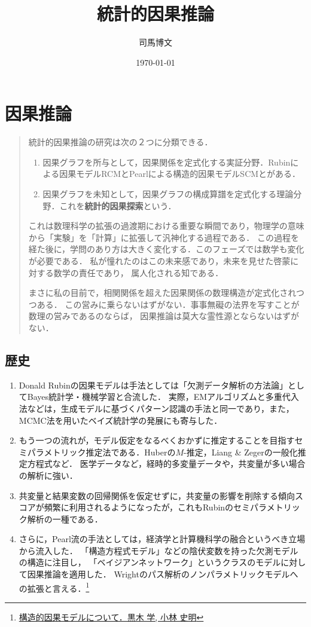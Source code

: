 \documentclass[uplatex,dvipdfmx]{jsreport}
\title{統計的因果推論}
\author{司馬博文}
\date{\today}
\begin{document}
\tableofcontents

\chapter{因果推論}

\begin{quotation}
    統計的因果推論の研究は次の２つに分類できる．
    \begin{enumerate}
        \item 因果グラフを所与として，因果関係を定式化する実証分野．Rubinによる因果モデルRCMとPearlによる構造的因果モデルSCMとがある．
        \item 因果グラフを未知として，因果グラフの構成算譜を定式化する理論分野．これを\textbf{統計的因果探索}という．
    \end{enumerate}
    これは数理科学の拡張の過渡期における重要な瞬間であり，物理学の意味から「実験」を「計算」に拡張して汎神化する過程である．
    この過程を経た後に，学問のあり方は大きく変化する．このフェーズでは数学も変化が必要である．
    私が憧れたのはこの未来感であり，未来を見せた啓蒙に対する数学の責任であり，
    属人化される知である．

    まさに私の目前で，相関関係を超えた因果関係の数理構造が定式化されつつある．
    この営みに乗らないはずがない．事事無礙の法界を写すことが数理の営みであるのならば，
    因果推論は莫大な霊性源とならないはずがない．
\end{quotation}

\section{歴史}

\begin{history}\mbox{}
    \begin{enumerate}
        \item Donald Rubinの因果モデルは手法としては「欠測データ解析の方法論」としてBayes統計学・機械学習と合流した．
        実際，EMアルゴリズムと多重代入法などは，生成モデルに基づくパターン認識の手法と同一であり，また，MCMC法を用いたベイズ統計学の発展にも寄与した．
        \item もう一つの流れが，モデル仮定をなるべくおかずに推定することを目指すセミパラメトリック推定法である．Huberの$M$-推定，Liang \& Zegerの一般化推定方程式など．
        医学データなど，経時的多変量データや，共変量が多い場合の解析に強い．
        \item 共変量と結果変数の回帰関係を仮定せずに，共変量の影響を削除する傾向スコアが頻繁に利用されるようになったが，これもRubinのセミパラメトリック解析の一種である．
        \item さらに，Pearl流の手法としては，経済学と計算機科学の融合というべき立場から流入した．
        「構造方程式モデル」などの陰伏変数を持った欠測モデルの構造に注目し，
        「ベイジアンネットワーク」というクラスのモデルに対して因果推論を適用した．
        Wrightのパス解析のノンパラメトリックモデルへの拡張と言える．\footnote{\href{https://www.jstage.jst.go.jp/article/jjb/32/2/32_119/_article/-char/ja/}{構造的因果モデルについて．黒木 学, 小林 史明}}
    \end{enumerate}
\end{history}
\end{document}
